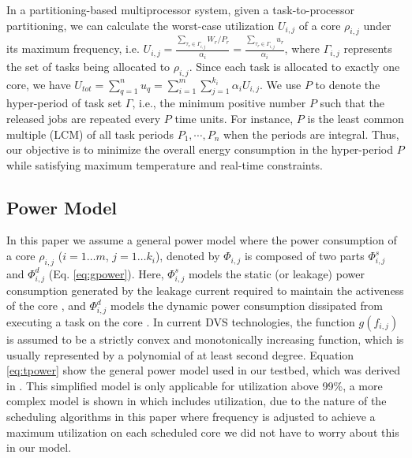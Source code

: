 \documentclass[conference]{IEEEtran}
\begin{document}
%
%
In a partitioning-based multiprocessor system, given a task-to-processor partitioning, we can calculate the worst-case utilization $U_{i,j}$ of a core $\rho_{i,j}$ under its maximum frequency, i.e. $U_{i,j}=\frac{\sum_{\tau_r \in  \Gamma_{i,j}} W_r/P_r}{\alpha_i}=\frac{\sum_{\tau_r \in  \Gamma_{i,j}} u_r}{\alpha_i}$, where $\Gamma_{i,j}$ represents the set of tasks being allocated to $\rho_{i,j}$. Since each task is allocated to exactly one core, we have $U_{tot} = \sum_{q=1}^{n} u_q = \sum_{i=1}^{m} \sum_{j=1}^{k_i} \alpha_i U_{i,j}$.
We use $P$ to denote the hyper-period of task set $\Gamma$, i.e., the minimum positive number $P$ such that the released jobs are repeated every $P$ time units. For instance, $P$ is the least common multiple (LCM) of all task periods $P_1, \cdots, P_n$ when the periods are integral.
Thus, our objective is to minimize the overall energy consumption in the hyper-period $P$ while satisfying maximum temperature and real-time constraints.

\subsection{Power Model}
\label{power-model}
In this paper we assume a general power model where the power consumption of a core $\rho_{i,j}$  ($i=1\ldots m$, $j=1\ldots k_i$), denoted by $\Phi_{i,j}$ is composed of two
parts $\Phi^{s}_{i,j}$ and $\Phi^{d}_{i,j}$ (Eq. \ref{eq:gpower}). Here, $\Phi^{s}_{i,j}$ models the static
(or leakage) power consumption
generated by the leakage current required to maintain the activeness of the core \cite{Chen09,Langen06}, and
$\Phi^{d}_{i,j}$ models the dynamic power
consumption dissipated from executing a task on the core \cite{Aydin03}.
In current DVS technologies, the function $g(f_{i,j})$ is assumed to be a strictly convex and monotonically increasing function,
which is usually represented by a polynomial of at least second degree.
Equation \ref{eq:tpower} show the general power model used in our testbed, which was derived in \cite{Li12}. This simplified model is only applicable for utilization above 99\%, a more complex model is shown in \cite{Li12} which includes utilization, due to the nature of the scheduling algorithms in this paper where frequency is adjusted to achieve a maximum utilization on each scheduled core we did not have to worry about this in our model.
\end{document}

